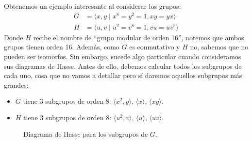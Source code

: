 \begin{ejemplo}
    Obtenemos un ejemplo interesante al considerar los grupos:
    \begin{align*}
        G &= \langle x,y \mid x^8=y^2=1, xy=yx \rangle \\
        H &= \langle u,v \mid u^2 = v^8 = 1, vu = uv^5 \rangle 
    \end{align*}
    Donde $H$ recibe el nombre de ``grupo modular de orden 16'', notemos que ambos grupos tienen orden 16. Además, como $G$ es conmutativo y $H$ no, sabemos que no pueden ser isomorfos. Sin embargo, sucede algo particular cuando consideramos sus diagramas de Hasse. Antes de ello, debemos calcular todos los subgrupos de cada uno, cosa que no vamos a detallar pero sí daremos aquellos subgrupos más grandes:
    \begin{itemize}
        \item $G$ tiene 3 subgrupos de orden 8: $\langle x^2,y \rangle $, $\langle x \rangle $, $\langle xy \rangle $.
        \item $H$ tiene 3 subgrupos de orden 8: $\langle u^2, v \rangle $, $\langle u \rangle $, $\langle uv \rangle $.
    \end{itemize}

\begin{figure}[H]
    \centering
    \caption{Diagrama de Hasse para los subgrupos de $G$.}
\end{figure}


\end{ejemplo}
